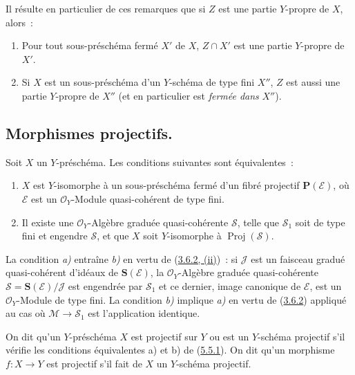 Il résulte en particulier de ces remarques que si $Z$ est une partie
$Y$-propre de $X$, alors~:
\begin{enumerate}
  \item[\rm{1\textsuperscript{o}}] Pour tout sous-préschéma fermé $X'$ de
  $X$, $Z\cap X'$ est une partie $Y$-propre de $X'$.
  \item[\rm{2\textsuperscript{o}}] Si $X$ est un sous-préschéma d'un
  $Y$-schéma de type fini $X''$, $Z$ est aussi une partie $Y$-propre de
  $X''$ (et en particulier est \emph{fermée dans} $X''$).
\end{enumerate}

\subsection{Morphismes projectifs.}
\label{subsection:II.5.5-fr}

\begin{proposition}[5.5.1]
\label{II.5.5.1-fr}
Soit $X$ un $Y$-préschéma. Les conditions suivantes sont équivalentes~:
\begin{enumerate}
  \item[\rm{a)}] $X$ est $Y$-isomorphe à un sous-préschéma \textup{fermé} d'un fibré
  projectif $\mathbf{P}(\mathcal{E})$, où $\mathcal{E}$ est un
  $\mathcal{O}_Y$-Module quasi-cohérent de type fini.
  \item[\rm{b)}] Il existe une $\mathcal{O}_Y$-Algèbre graduée
  quasi-cohérente $\mathcal{S}$, telle que $\mathcal{S}_1$ soit de type fini
  et engendre $\mathcal{S}$, et que $X$ soit $Y$-isomorphe à
  $\operatorname{Proj}(\mathcal{S})$.
\end{enumerate}
\end{proposition}

La condition \emph{a)} entraîne \emph{b)} en vertu de
(\hyperref[II.3.6.2-fr]{3.6.2, (ii)})~: si $\mathcal{J}$ est un faisceau
gradué quasi-cohérent d'idéaux de $\mathbf{S}(\mathcal{E})$, la
$\mathcal{O}_Y$-Algèbre graduée quasi-cohérente
$\mathcal{S}=\mathbf{S}(\mathcal{E})/\mathcal{J}$ est engendrée par
$\mathcal{S}_1$ et ce dernier, image canonique de $\mathcal{E}$, est un
$\mathcal{O}_Y$-Module de type fini. La condition \emph{b)} implique \emph{a)} en vertu de
(\hyperref[II.3.6.2-fr]{3.6.2}) appliqué au cas où
$\mathcal{M}\to\mathcal{S}_1$ est l'application identique.


\begin{definition}[5.5.2]
\label{II.5.5.2-fr}
On dit qu'un $Y$-préschéma $X$ est projectif sur $Y$ ou est un
$Y$-schéma projectif s'il vérifie les conditions équivalentes \textup{a)} et \textup{b)}
de (\hyperref[II.5.5.1-fr]{5.5.1}). On dit qu'un morphisme $f:X\to Y$ est
projectif s'il fait de $X$ un $Y$-schéma projectif.
\end{definition}

